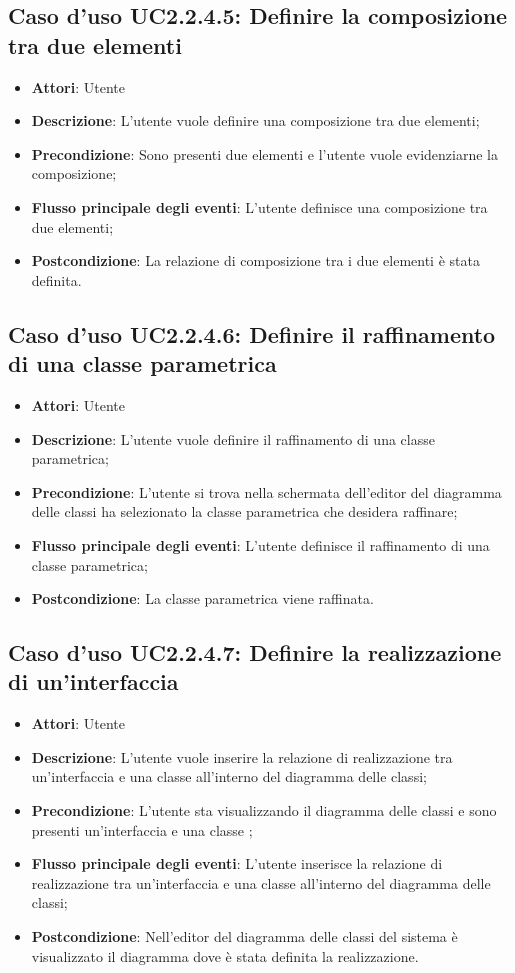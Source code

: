 \documentclass[../AnalisiDeiRequisiti.tex]{subfiles}
\begin{document}
			\subsection{Caso d'uso UC2.2.4.5: Definire la composizione tra due elementi}
			\begin{itemize}
				\item \textbf{Attori}: Utente
				\item \textbf{Descrizione}: L'utente vuole definire una composizione tra due elementi;
				\item \textbf{Precondizione}: Sono presenti due elementi e l'utente vuole evidenziarne la composizione;
				\item \textbf{Flusso principale degli eventi}: L'utente definisce una composizione tra due elementi;
				\item \textbf{Postcondizione}: La relazione di composizione tra i due elementi è stata definita.
			\end{itemize}
			\subsection{Caso d'uso UC2.2.4.6: Definire il raffinamento di una classe parametrica}
			\begin{itemize}
				\item \textbf{Attori}: Utente
				\item \textbf{Descrizione}: L'utente vuole definire il raffinamento di una classe parametrica;
				\item \textbf{Precondizione}: L'utente si trova nella schermata dell'editor del diagramma delle classi ha selezionato la classe parametrica che desidera raffinare;
				\item \textbf{Flusso principale degli eventi}: L'utente definisce il raffinamento di una classe parametrica;
				\item \textbf{Postcondizione}: La classe parametrica viene raffinata.
			\end{itemize}
			\subsection{Caso d'uso UC2.2.4.7: Definire la realizzazione di un'interfaccia}
			\begin{itemize}
				\item \textbf{Attori}: Utente
				\item \textbf{Descrizione}: L'utente vuole inserire la relazione di realizzazione tra  un'interfaccia e una classe all'interno del diagramma delle classi;
				\item \textbf{Precondizione}: L'utente sta visualizzando il diagramma delle classi e sono presenti un'interfaccia e una classe ;
				\item \textbf{Flusso principale degli eventi}: L'utente inserisce la relazione di realizzazione tra  un'interfaccia e una classe all'interno del diagramma delle classi;
				\item \textbf{Postcondizione}: Nell'editor del diagramma delle classi del sistema è visualizzato il diagramma dove è stata definita la realizzazione.
			\end{itemize}
\end{document}
